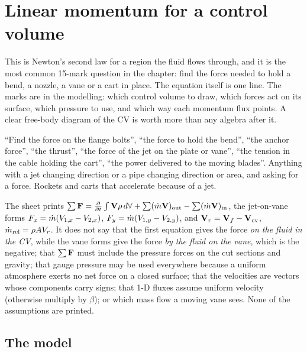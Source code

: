 \section{Linear momentum for a control volume}
\label{sec:momentum}

This is Newton's second law for a region the fluid flows through, and it is the most common 15-mark question in the chapter: find the force needed to hold a bend, a nozzle, a vane or a cart in place. The equation itself is one line. The marks are in the modelling: which control volume to draw, which forces act on its surface, which pressure to use, and which way each momentum flux points. A clear free-body diagram of the CV is worth more than any algebra after it.

\begin{recognise}
``Find the force on the flange bolts'', ``the force to hold the bend'', ``the anchor force'', ``the thrust'', ``the force of the jet on the plate or vane'', ``the tension in the cable holding the cart'', ``the power delivered to the moving blades''. Anything with a jet changing direction or a pipe changing direction or area, and asking for a force. Rockets and carts that accelerate because of a jet.
\end{recognise}

\begin{onsheet}
The sheet prints $\sum\mathbf{F} = \frac{\partial }{\partial t}\int\mathbf{V}\rho\,d\forall + \sum(\dot m\mathbf{V})_\text{out} - \sum(\dot m\mathbf{V})_\text{in}$, the jet-on-vane forms $F_x = \dot m(V_{1,x} - V_{2,x})$, $F_y = \dot m(V_{1,y} - V_{2,y})$, and $\mathbf{V}_r = \mathbf{V}_f - \mathbf{V}_\text{cv}$, $\dot m_\text{rel} = \rho AV_r$. It does not say that the first equation gives the force \emph{on the fluid in the CV}, while the vane forms give the force \emph{by the fluid on the vane}, which is the negative; that $\sum\mathbf{F}$ must include the pressure forces on the cut sections and gravity; that gauge pressure may be used everywhere because a uniform atmosphere exerts no net force on a closed surface; that the velocities are vectors whose components carry signs; that 1-D fluxes assume uniform velocity (otherwise multiply by $\beta$); or which mass flow a moving vane sees. None of the assumptions are printed.
\end{onsheet}

\subsection*{The model}

